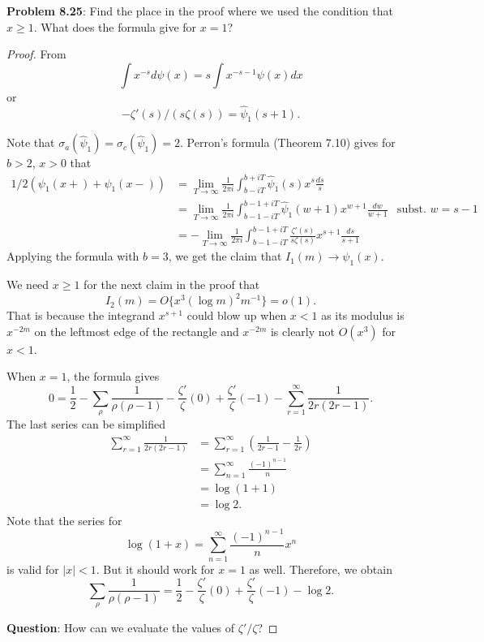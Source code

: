 \documentclass[12pt]{article}
\newcommand{\psihat}{\widehat{\psi}}
\begin{document}
\fi

\textbf{Problem 8.25}: Find the place in the proof where we used the condition that $x \geq 1$. What does the formula give for $x = 1$?

\begin{proof}
From
$$\int x^{-s} d\psi(x) = s \int x^{-s-1} \psi(x) dx$$
or
$$-\zeta'(s)/(s\zeta(s)) = \psihat_1(s + 1).$$

Note that $\sigma_a(\psihat_1) = \sigma_c(\psihat_1) = 2$. Perron's formula (Theorem 7.10) gives for $b > 2$, $x > 0$ that
\begin{align*}
1/2(\psi_1(x+) + \psi_1(x-)) &= \lim_{T \rightarrow \infty} \frac{1}{2 \pi i} \int_{b - iT}^{b + iT} \psihat_1(s) x^s \frac{ds}{s}\\
&= \lim_{T \rightarrow \infty} \frac{1}{2 \pi i} \int_{b - 1 - iT}^{b - 1 + iT} \psihat_1(w + 1) x^{w + 1} \frac{dw}{w + 1} &\text{subst. } w = s - 1\\
&= -\lim_{T \rightarrow \infty} \frac{1}{2 \pi i} \int_{b - 1 - iT}^{b - 1 + iT} \frac{\zeta'(s)}{s\zeta(s)} x^{s + 1} \frac{ds}{s + 1}
\end{align*}
Applying the formula with $b = 3$, we get the claim that $I_1(m) \rightarrow \psi_1(x)$.

We need $x \geq 1$ for the next claim in the proof that
$$I_2(m) = O\{x^3 (\log m)^2 m^{-1}\} = o(1).$$
That is because the integrand $x^{s+1}$ could blow up when $x < 1$ as its modulus is $x^{-2m}$ on the leftmost edge of the rectangle and $x^{-2m}$ is clearly not $O(x^3)$ for $x < 1$.

When $x = 1$, the formula gives
$$0 = \frac{1}{2} - \sum_\rho \frac{1}{\rho(\rho - 1)} - \frac{\zeta'}{\zeta}(0) + \frac{\zeta'}{\zeta}(-1) - \sum_{r = 1}^{\infty} \frac{1}{2r(2r - 1)}.$$
The last series can be simplified
\begin{align*}
\sum_{r = 1}^{\infty} \frac{1}{2r(2r - 1)} &= \sum_{r = 1}^{\infty} \left( \frac{1}{2r - 1} - \frac{1}{2r} \right)\\
&= \sum_{n = 1}^{\infty} \frac{(-1)^{n-1}}{n}\\
&= \log(1 + 1)\\
&= \log 2.
\end{align*}
Note that the series for
$$\log(1 + x) = \sum_{n=1}^{\infty} \frac{(-1)^{n-1}}{n} x^n$$
is valid for $|x| < 1$. But it should work for $x = 1$ as well.
Therefore, we obtain
$$\sum_\rho \frac{1}{\rho(\rho - 1)} = \frac{1}{2} - \frac{\zeta'}{\zeta}(0) + \frac{\zeta'}{\zeta}(-1) - \log 2.$$

\textbf{Question}: How can we evaluate the values of $\zeta'/\zeta$?


\end{proof}
\end{document}
